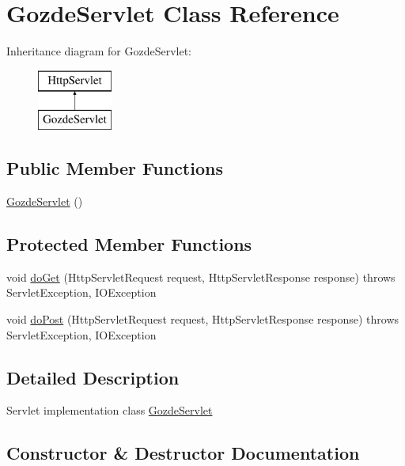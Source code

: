\hypertarget{class_gozde_servlet}{}\section{Gozde\+Servlet Class Reference}
\label{class_gozde_servlet}
Inheritance diagram for Gozde\+Servlet\+:\begin{figure}[H]
\begin{center}
\leavevmode
\includegraphics[height=2.000000cm]{class_gozde_servlet}
\end{center}
\end{figure}
\subsection*{Public Member Functions}
\begin{DoxyCompactItemize}
\item 
\hyperlink{class_gozde_servlet_a33fd50df42a07c8b6f1155d084f661ca}{Gozde\+Servlet} ()
\end{DoxyCompactItemize}
\subsection*{Protected Member Functions}
\begin{DoxyCompactItemize}
\item 
void \hyperlink{class_gozde_servlet_acb63c2b11dd710bc124d6eeb89e435ca}{do\+Get} (Http\+Servlet\+Request request, Http\+Servlet\+Response response)  throws Servlet\+Exception, I\+O\+Exception 
\item 
void \hyperlink{class_gozde_servlet_a229714dc005134976cd60c59c20d84c8}{do\+Post} (Http\+Servlet\+Request request, Http\+Servlet\+Response response)  throws Servlet\+Exception, I\+O\+Exception 
\end{DoxyCompactItemize}


\subsection{Detailed Description}
Servlet implementation class \hyperlink{class_gozde_servlet}{Gozde\+Servlet} 

\subsection{Constructor \& Destructor Documentation}
\hypertarget{class_gozde_servlet_a33fd50df42a07c8b6f1155d084f661ca}{}
